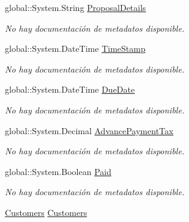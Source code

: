 \begin{DoxyCompactItemize}
global\-::\-System.\-String \hyperlink{class_game_memory_1_1_invoices_a381a2b51810c12b0c4c5e7603c0ae942}{Proposal\-Details}
\begin{DoxyCompactList}\small\item\em No hay documentación de metadatos disponible. \end{DoxyCompactList}\item 
global\-::\-System.\-Date\-Time \hyperlink{class_game_memory_1_1_invoices_af2fd7641a9681d57e3aa2583bc90b458}{Time\-Stamp}
\begin{DoxyCompactList}\small\item\em No hay documentación de metadatos disponible. \end{DoxyCompactList}\item 
global\-::\-System.\-Date\-Time \hyperlink{class_game_memory_1_1_invoices_a34f6ae1c319669d255f64b19e6574218}{Due\-Date}
\begin{DoxyCompactList}\small\item\em No hay documentación de metadatos disponible. \end{DoxyCompactList}\item 
global\-::\-System.\-Decimal \hyperlink{class_game_memory_1_1_invoices_a4c8fb4bba4408487adde6b055abec055}{Advance\-Payment\-Tax}
\begin{DoxyCompactList}\small\item\em No hay documentación de metadatos disponible. \end{DoxyCompactList}\item 
global\-::\-System.\-Boolean \hyperlink{class_game_memory_1_1_invoices_a494ac26836e51198ef21d28dbe0c63e4}{Paid}
\begin{DoxyCompactList}\small\item\em No hay documentación de metadatos disponible. \end{DoxyCompactList}\item 
\hyperlink{class_game_memory_1_1_customers}{Customers} \hyperlink{class_game_memory_1_1_invoices_a0acb5cf5f80c7dcda908489338671b37}{Customers}

\end{DoxyCompactItemize}
